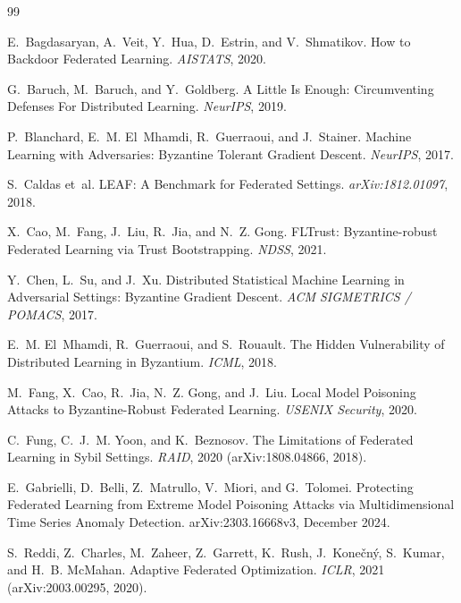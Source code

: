 \documentclass[11pt,a4paper]{article}
\begin{document}
\begin{thebibliography}{99}
\small

E.~Bagdasaryan, A.~Veit, Y.~Hua, D.~Estrin, and V.~Shmatikov.
\newblock How to Backdoor Federated Learning.
\newblock \emph{AISTATS}, 2020.

G.~Baruch, M.~Baruch, and Y.~Goldberg.
\newblock A Little Is Enough: Circumventing Defenses For Distributed Learning.
\newblock \emph{NeurIPS}, 2019.

P.~Blanchard, E.~M. El~Mhamdi, R.~Guerraoui, and J.~Stainer.
\newblock Machine Learning with Adversaries: Byzantine Tolerant Gradient Descent.
\newblock \emph{NeurIPS}, 2017.

S.~Caldas et~al.
\newblock LEAF: A Benchmark for Federated Settings.
\newblock \emph{arXiv:1812.01097}, 2018.

X.~Cao, M.~Fang, J.~Liu, R.~Jia, and N.~Z. Gong.
\newblock FLTrust: Byzantine-robust Federated Learning via Trust Bootstrapping.
\newblock \emph{NDSS}, 2021.

Y.~Chen, L.~Su, and J.~Xu.
\newblock Distributed Statistical Machine Learning in Adversarial Settings:
  Byzantine Gradient Descent.
\newblock \emph{ACM SIGMETRICS / POMACS}, 2017.

E.~M. El~Mhamdi, R.~Guerraoui, and S.~Rouault.
\newblock The Hidden Vulnerability of Distributed Learning in Byzantium.
\newblock \emph{ICML}, 2018.

M.~Fang, X.~Cao, R.~Jia, N.~Z. Gong, and J.~Liu.
\newblock Local Model Poisoning Attacks to Byzantine-Robust Federated Learning.
\newblock \emph{USENIX Security}, 2020.

C.~Fung, C.~J.~M. Yoon, and K.~Beznosov.
\newblock The Limitations of Federated Learning in Sybil Settings.
\newblock \emph{RAID}, 2020 (arXiv:1808.04866, 2018).

E.~Gabrielli, D.~Belli, Z.~Matrullo, V.~Miori, and G.~Tolomei.
\newblock Protecting Federated Learning from Extreme Model Poisoning
  Attacks via Multidimensional Time Series Anomaly Detection.
\newblock arXiv:2303.16668v3, December 2024.

S.~Reddi, Z.~Charles, M.~Zaheer, Z.~Garrett, K.~Rush, J.~Kone\v{c}n\'y,
  S.~Kumar, and H.~B. McMahan.
\newblock Adaptive Federated Optimization.
\newblock \emph{ICLR}, 2021 (arXiv:2003.00295, 2020).


\end{thebibliography}
\end{document}
